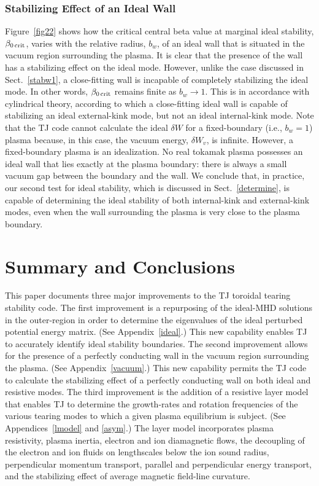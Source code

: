\documentclass[12pt,prb,aps]{revtex4-1}
\begin{document}
\subsubsection{Stabilizing Effect of an Ideal Wall}
Figure~\ref{fig22} shows how the critical central beta value at marginal ideal stability, $\beta_{0\,{\rm crit}}$, varies with the
relative radius, $b_w$, of an ideal wall that is situated in the vacuum region surrounding the plasma.  It is clear that the
presence of the wall has a stabilizing effect on the ideal mode.   However, unlike the case discussed in Sect.~\ref{stabw1}, a close-fitting wall is incapable of
completely stabilizing the ideal mode. In other words,  $\beta_{0\,{\rm crit}}$ remains finite as $b_w\rightarrow 1$. This is in accordance with cylindrical theory, according to which a close-fitting ideal
wall is capable of stabilizing an ideal external-kink mode, but not an ideal internal-kink mode.\cite{freidberg,wesson}
Note that the TJ code cannot calculate the ideal $\delta W$ for a fixed-boundary (i.e., $b_w=1$)  plasma because, in this
case, the vacuum energy, $\delta W_v$, is infinite. However, a fixed-boundary plasma is an idealization. No real tokamak
plasma possesses an ideal wall that lies exactly at the plasma boundary: there is always a small vacuum gap
between the boundary and the wall. We conclude that, in practice, our second test for ideal stability, 
which is discussed in Sect.~\ref{determine}, is capable of determining the ideal stability of both internal-kink and external-kink
modes, even when the wall surrounding the plasma is very close to the plasma boundary.

\section{Summary and Conclusions}\label{conc}
This paper documents three major improvements to the TJ toroidal tearing stability code.\cite{tj} The first improvement is a repurposing of the
ideal-MHD solutions in the outer-region in order to determine the eigenvalues of the ideal perturbed potential energy matrix. (See Appendix~\ref{ideal}.)
This new capability enables TJ to accurately identify ideal stability boundaries. The second improvement allows for the presence of
a perfectly conducting wall in the vacuum region surrounding the plasma. (See Appendix~\ref{vacuum}.) This new capability permits the TJ code 
to calculate the stabilizing effect of a perfectly conducting wall on both ideal and resistive modes. The third improvement is the addition of
a resistive layer model that enables TJ to determine the  growth-rates and rotation frequencies of the various tearing modes to which a
given plasma equilibrium is subject. (See Appendices~\ref{lmodel} and \ref{asym}.) The layer model incorporates 
plasma resistivity, plasma inertia, electron and ion diamagnetic flows, the decoupling of the electron and ion fluids on lengthscales below the ion sound radius, perpendicular
momentum transport, parallel and perpendicular energy transport, and the stabilizing effect of average magnetic field-line curvature.
\end{document}
